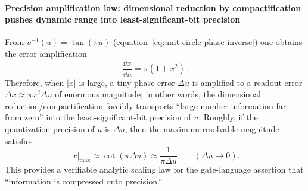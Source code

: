 \paragraph{Precision amplification law: dimensional reduction by compactification pushes dynamic range into least-significant-bit precision}
From \(\upsilon^{-1}(u)=\tan(\pi u)\) (equation~\eqref{eq:unit-circle-phase-inverse}) one obtains the error amplification
\begin{equation}\label{eq:app-precision-amplification}
\boxed{\ \frac{\dd x}{\dd u}=\pi(1+x^2)\ }.
\end{equation}
Therefore, when \(|x|\) is large, a tiny phase error \(\Delta u\) is amplified to a readout error \(\Delta x\approx \pi x^2\Delta u\) of enormous magnitude; in other words, the dimensional reduction/compactification forcibly transports ``large-number information far from zero'' into the least-significant-bit precision of \(u\).
Roughly, if the quantization precision of \(u\) is \(\Delta u\), then the maximum resolvable magnitude satisfies
\[
|x|_{\max}\approx \cot(\pi\Delta u)\approx \frac{1}{\pi\Delta u}\qquad(\Delta u\to 0).
\]
This provides a verifiable analytic scaling law for the gate-language assertion that ``information is compressed onto precision.''
